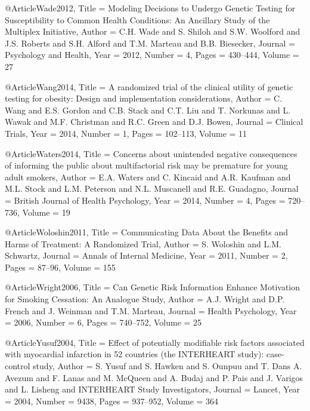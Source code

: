 @Article{Wade2012,
  Title                    = {Modeling Decisions to Undergo Genetic Testing for Susceptibility to Common Health Conditions: An Ancillary Study of the Multiplex Initiative},
  Author                   = {C.H. Wade and S. Shiloh and S.W. Woolford and J.S. Roberts and S.H. Alford and T.M. Marteau and B.B. Biesecker},
  Journal                  = {Psychology and Health},
  Year                     = {2012},
  Number                   = {4},
  Pages                    = {430--444},
  Volume                   = {27}
}

@Article{Wang2014,
  Title                    = {A randomized trial of the clinical utility of genetic testing for obesity: Design and implementation considerations},
  Author                   = {C. Wang and E.S. Gordon and C.B. Stack and C.T. Liu and T. Norkunas and L. Wawak and M.F. Christman and R.C. Green and D.J. Bowen},
  Journal                  = {Clinical Trials},
  Year                     = {2014},
  Number                   = {1},
  Pages                    = {102--113},
  Volume                   = {11}
}

@Article{Waters2014,
  Title                    = {Concerns about unintended negative consequences of informing the public about multifactorial risk may be premature for young adult smokers},
  Author                   = {E.A. Waters and C. Kincaid and A.R. Kaufman and M.L. Stock and L.M. Peterson and N.L. Muscanell and R.E. Guadagno},
  Journal                  = {British Journal of Health Psychology},
  Year                     = {2014},
  Number                   = {4},
  Pages                    = {720--736},
  Volume                   = {19}
}

@Article{Woloshin2011,
  Title                    = {Communicating Data About the Benefits and Harms of Treatment: A Randomized Trial},
  Author                   = {S. Woloshin and L.M. Schwartz},
  Journal                  = {Annals of Internal Medicine},
  Year                     = {2011},
  Number                   = {2},
  Pages                    = {87--96},
  Volume                   = {155}
}

@Article{Wright2006,
  Title                    = {Can Genetic Risk Information Enhance Motivation for Smoking Cessation: An Analogue Study},
  Author                   = {A.J. Wright and D.P. French and J. Weinman and T.M. Marteau},
  Journal                  = {Health Psychology},
  Year                     = {2006},
  Number                   = {6},
  Pages                    = {740--752},
  Volume                   = {25}
}

@Article{Yusuf2004,
  Title                    = {Effect of potentially modifiable risk factors associated with myocardial infarction in 52 countries (the INTERHEART study): case-control study},
  Author                   = {S. Yusuf and S. Hawken and S. Ounpuu and T. Dans A. Avezum and F. Lanas and M. McQueen and A. Budaj and P. Pais and J. Varigos and L. Lisheng and {INTERHEART Study Investigators}},
  Journal                  = {Lancet},
  Year                     = {2004},
  Number                   = {9438},
  Pages                    = {937--952},
  Volume                   = {364}
}


